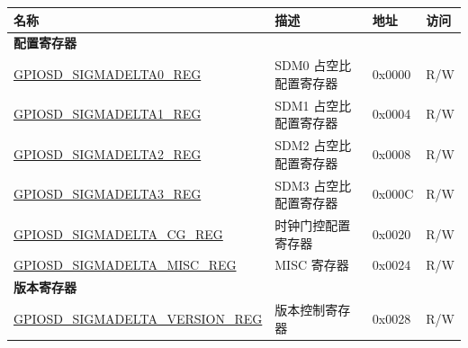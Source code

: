\begin{longtable}{ | p{6cm} | p{7.2cm} | p{1.3cm} | p{1cm} | }
\hline\rowcolor{lightgray}
名称 & 描述 & 地址 & 访问 \\ \hline
\endhead
\multicolumn{4}{|l|}{\textbf{配置寄存器}} \\ \hline
\hyperref[regdesc:GPIOSDSIGMADELTANREG]{GPIOSD\_SIGMADELTA0\_REG} & SDM0 占空比配置寄存器 & 0x0000 & R/W \\ \hline
\hyperref[regdesc:GPIOSDSIGMADELTANREG]{GPIOSD\_SIGMADELTA1\_REG} & SDM1 占空比配置寄存器 & 0x0004 & R/W \\ \hline
\hyperref[regdesc:GPIOSDSIGMADELTANREG]{GPIOSD\_SIGMADELTA2\_REG} & SDM2 占空比配置寄存器 & 0x0008 & R/W \\ \hline
\hyperref[regdesc:GPIOSDSIGMADELTANREG]{GPIOSD\_SIGMADELTA3\_REG} & SDM3 占空比配置寄存器 & 0x000C & R/W \\ \hline
\hyperref[regdesc:GPIOSDSIGMADELTACGREG]{GPIOSD\_SIGMADELTA\_CG\_REG} & 时钟门控配置寄存器 & 0x0020 & R/W \\ \hline
\hyperref[regdesc:GPIOSDSIGMADELTAMISCREG]{GPIOSD\_SIGMADELTA\_MISC\_REG} & MISC 寄存器 & 0x0024 & R/W \\ \hline
\multicolumn{4}{|l|}{\textbf{版本寄存器}} \\ \hline
\hyperref[regdesc:GPIOSDSIGMADELTAVERSIONREG]{GPIOSD\_SIGMADELTA\_VERSION\_REG} & 版本控制寄存器 & 0x0028 & R/W \\ \hline
\end{longtable}
